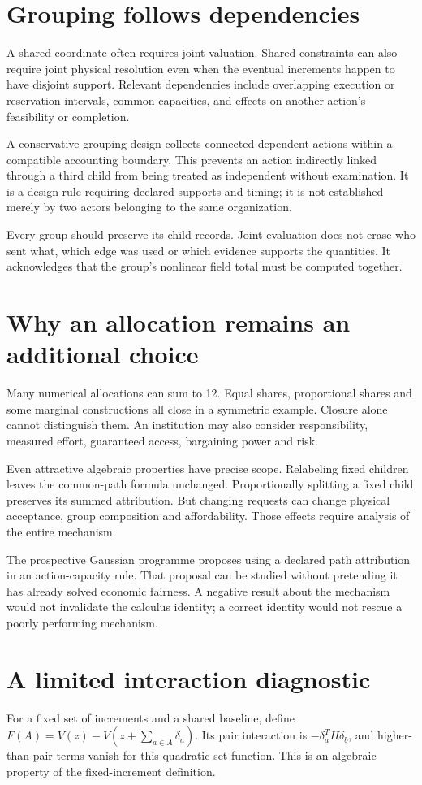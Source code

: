 \section{Grouping follows dependencies}
A shared coordinate often requires joint valuation. Shared constraints can also require joint physical resolution even when the eventual increments happen to have disjoint support. Relevant dependencies include overlapping execution or reservation intervals, common capacities, and effects on another action's feasibility or completion.

A conservative grouping design collects connected dependent actions within a compatible accounting boundary. This prevents an action indirectly linked through a third child from being treated as independent without examination. It is a design rule requiring declared supports and timing; it is not established merely by two actors belonging to the same organization.

Every group should preserve its child records. Joint evaluation does not erase who sent what, which edge was used or which evidence supports the quantities. It acknowledges that the group's nonlinear field total must be computed together.

\section{Why an allocation remains an additional choice}
Many numerical allocations can sum to 12. Equal shares, proportional shares and some marginal constructions all close in a symmetric example. Closure alone cannot distinguish them. An institution may also consider responsibility, measured effort, guaranteed access, bargaining power and risk.

Even attractive algebraic properties have precise scope. Relabeling fixed children leaves the common-path formula unchanged. Proportionally splitting a fixed child preserves its summed attribution. But changing requests can change physical acceptance, group composition and affordability. Those effects require analysis of the entire mechanism.

The prospective Gaussian programme proposes using a declared path attribution in an action-capacity rule. That proposal can be studied without pretending it has already solved economic fairness. A negative result about the mechanism would not invalidate the calculus identity; a correct identity would not rescue a poorly performing mechanism.

\section{A limited interaction diagnostic}
For a fixed set of increments and a shared baseline, define $F(A)=V(z)-V(z+\sum_{a\in A}\delta_a)$. Its pair interaction is $-\delta_a^TH\delta_b$, and higher-than-pair terms vanish for this quadratic set function. This is an algebraic property of the fixed-increment definition.


